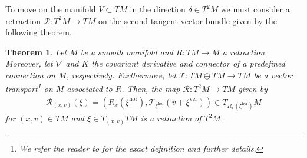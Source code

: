 \documentclass[11pt,a4paper]{article}
\theoremstyle{plain}
\newtheorem{theorem}{Theorem}[section]
\theoremstyle{definition}
\newcommand{\hor}{\operatorname{hor}}
\newcommand{\ver}{\operatorname{ver}}
\begin{document}
To move on the manifold $V\subset TM$ in the direction $\delta\in T^2M$ we must consider a retraction $\mathcal{R}\colon T^2M\to TM$ on the second tangent vector bundle given by the following theorem.
\begin{theorem}	
	\label{theorem: retraction tangent bundle}
	Let $M$ be a smooth manifold and $R\colon TM\to M$ a retraction.
	Moreover, let $\nabla$ and $K$ the covariant derivative and connector of a predefined connection on $M$, respectively. Furthermore, let $\mathcal{T}\colon TM\oplus TM\to TM$ be a vector transport\footnote{We refer the reader to \cite{absil2008} for the exact definition and further details.} on $M$ associated to $R$. Then, the map $\mathcal{R}\colon T^2M\to TM$ given by 
	\begin{align*}
		\mathcal{R}_{(x, v)}(\xi)
		= \left(R_x(\xi^{\hor}), \mathcal{T}_{\xi^{\hor}}(v + \xi^{\ver})\right)
		\in T_{R_x(\xi^{\hor})}M
	\end{align*}
	for $(x, v)\in TM$ and $\xi\in T_{(x, v)}TM$ is a retraction of $T^2M$.
\end{theorem}
\end{document}
